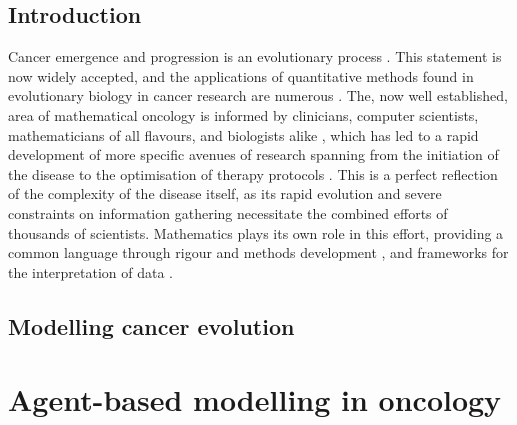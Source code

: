 \subsection{Introduction}
Cancer emergence and progression is an evolutionary process \cite{nowell_clonal_1976, merlo_cancer_2006}.
This statement is now widely accepted, and the applications of quantitative methods found in evolutionary
biology in cancer research are numerous \cite{rockne_2019_2019, yin_review_2019, kourou_applied_2021}.
The, now well established, area of mathematical oncology is informed by clinicians, computer scientists,
mathematicians of all flavours, and biologists alike \cite{bull_hallmarks_2022}, which has led to a rapid
development of more specific avenues of research spanning from the initiation of the disease
\cite{paterson_mathematical_2020} to the optimisation of therapy protocols
\cite{west_survey_2023}. This is a perfect reflection of the complexity
of the disease itself, as its rapid evolution and severe constraints on information gathering necessitate
the combined efforts of thousands of scientists. Mathematics plays its own role in this effort, providing
a common language through rigour and methods development \cite{},
and frameworks for the interpretation of data \cite{}.

\subsection{Modelling cancer evolution}


\section{Agent-based modelling in oncology}

